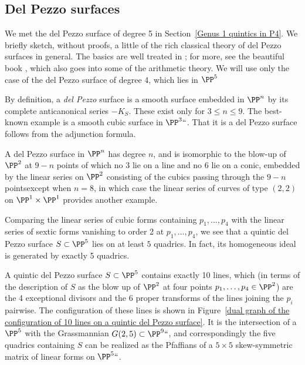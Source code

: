 \subsection{Del Pezzo surfaces}\label{Del Pezzo sketch}

We  met the del Pezzo surface of degree 5 in Section~\ref{Genus 1 quintics
in P4}.
We briefly sketch, without proofs, a little of the
 rich classical theory of del Pezzo surfaces in general. The basics are
 well treated in \cite[pp.~45--50]{Beauville}; for more, see the
beautiful book \cite{Manin}, which also goes into some of the arithmetic
theory. We will use only the case of the del Pezzo surface of degree 4,
which lies in $\PP^{5}$

By definition,
a \emph{del Pezzo} surface is a smooth surface embedded in $\PP^n$  by
its complete anticanonical series $-K_S$. These exist only for $3\leq
n\leq 9$. The best-known example is a smooth cubic surface in $\PP^3``$. 
That it is a del Pezzo surface follows from the adjunction formula.

A del Pezzo surface in $\PP^n$ has degree $n$, and is isomorphic to the
blow-up of $\PP^2$ at $9-n$ points of which no 3 lie on a line and no
6 lie on a conic, embedded by the linear series on $\PP^2$
consisting of the cubics passing through the $9-n$ points\emdash except
when $n=8$, in which case the
linear series of curves of type $(2,2)$ on $\PP^1\times \PP^1$ provides
another example.

Comparing the linear series  of cubic forms containing $p_1,\dots,p_4$
with the linear series  of sextic forms vanishing to order 2 at
$p_1,\dots,p_4$, we see that a quintic del Pezzo surface $S \subset \PP^5$
lies on at least $5$ quadrics. In fact, its homogeneous ideal is generated
by exactly 5 quadrics.

A quintic del Pezzo surface $S \subset \PP^5$ contains exactly 10 lines,
which (in terms of the description of $S$ as the blow up of $\PP^2$ at
four points $p_1,\dots,p_4 \in \PP^2$) are the 4 exceptional divisors
and the 6 proper transforms of the lines joining the $p_i$ pairwise. The
configuration of these lines is shown in Figure~\ref{dual graph of the
configuration of 10 lines on a quintic del Pezzo surface}.
It is the intersection of a $\PP^5$ with the Grassmannian $G(2,5)
\subset \PP^9` `$, and correspondingly the five quadrics containing $S$
can be realized as the Pfaffians of a  $5\times 5$ skew-symmetric matrix
of linear forms on $\PP^5` `$.

